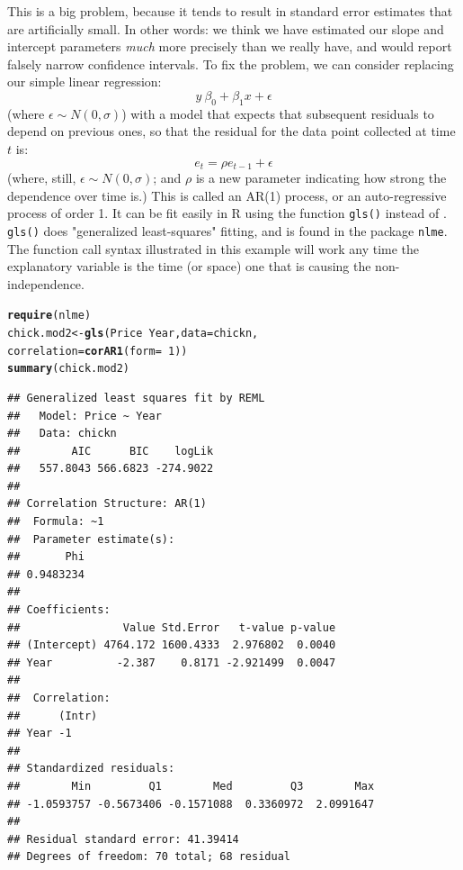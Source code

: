 \documentclass[twoside]{book}\usepackage[]{graphicx}\usepackage[]{xcolor}
\makeatletter
\newcommand{\hlnum}[1]{\textcolor[rgb]{0.686,0.059,0.569}{#1}}%
\newcommand{\hlopt}[1]{\textcolor[rgb]{0,0,0}{#1}}%
\newcommand{\hlstd}[1]{\textcolor[rgb]{0.345,0.345,0.345}{#1}}%
\newcommand{\hlkwb}[1]{\textcolor[rgb]{0.69,0.353,0.396}{#1}}%
\newcommand{\hlkwc}[1]{\textcolor[rgb]{0.333,0.667,0.333}{#1}}%
\newcommand{\hlkwd}[1]{\textcolor[rgb]{0.737,0.353,0.396}{\textbf{#1}}}%
\newenvironment{kframe}{%
 \def\at@end@of@kframe{}%
 \ifinner\ifhmode%
  \def\at@end@of@kframe{\end{minipage}}%
  \begin{minipage}{\columnwidth}%
 \fi\fi%
 \def\FrameCommand##1{\hskip\@totalleftmargin \hskip-\fboxsep
 \colorbox{shadecolor}{##1}\hskip-\fboxsep
     \hskip-\linewidth \hskip-\@totalleftmargin \hskip\columnwidth}%
 \MakeFramed {\advance\hsize-\width
   \@totalleftmargin\z@ \linewidth\hsize
   \@setminipage}}%
 {\par\unskip\endMakeFramed%
 \at@end@of@kframe}
\newenvironment{knitrout}{}{} %
\newcounter{example}[section]
\makeatother
\begin{document}
This is a big problem, because it tends to result in standard error estimates that are artificially small. In other words: we think we have estimated our slope and intercept parameters \emph{much} more precisely than we really have, and would report falsely narrow confidence intervals.
To fix the problem, we can consider replacing our simple linear regression:
$$ y ~ \beta_0 + \beta_1x + \epsilon$$
(where $\epsilon \sim N(0, \sigma)$) with a model that expects that subsequent residuals to depend on previous ones, so that the residual for the data point collected at time $t$ is:
$$ e_t = \rho e_{t-1} + \epsilon$$
(where, still, $\epsilon \sim N(0, \sigma)$; and $\rho$ is a new parameter indicating how strong the dependence over time is.)  This is called an AR(1) process, or an auto-regressive process of order 1.  It can be fit easily in R using the function \texttt{gls()} instead of . \texttt{gls()} does "generalized least-squares" fitting, and is found in the package \texttt{nlme}.  The function call syntax illustrated in this example will work any time the explanatory variable is the time (or space) one that is causing the non-independence.

\begin{knitrout}
\color{fgcolor}\begin{kframe}
\begin{alltt}
\hlkwd{require}\hlstd{(nlme)}
\hlstd{chick.mod2} \hlkwb{<-} \hlkwd{gls}\hlstd{(Price}\hlopt{~}\hlstd{Year,} \hlkwc{data}\hlstd{=chickn,}
                  \hlkwc{correlation}\hlstd{=}\hlkwd{corAR1}\hlstd{(}\hlkwc{form}\hlstd{=}\hlopt{~}\hlnum{1}\hlstd{))}
\hlkwd{summary}\hlstd{(chick.mod2)}
\end{alltt}
\begin{verbatim}
## Generalized least squares fit by REML
##   Model: Price ~ Year 
##   Data: chickn 
##        AIC      BIC    logLik
##   557.8043 566.6823 -274.9022
## 
## Correlation Structure: AR(1)
##  Formula: ~1 
##  Parameter estimate(s):
##       Phi 
## 0.9483234 
## 
## Coefficients:
##                Value Std.Error   t-value p-value
## (Intercept) 4764.172 1600.4333  2.976802  0.0040
## Year          -2.387    0.8171 -2.921499  0.0047
## 
##  Correlation: 
##      (Intr)
## Year -1    
## 
## Standardized residuals:
##        Min         Q1        Med         Q3        Max 
## -1.0593757 -0.5673406 -0.1571088  0.3360972  2.0991647 
## 
## Residual standard error: 41.39414 
## Degrees of freedom: 70 total; 68 residual
\end{verbatim}
\end{kframe}
\end{knitrout}
\end{document}
